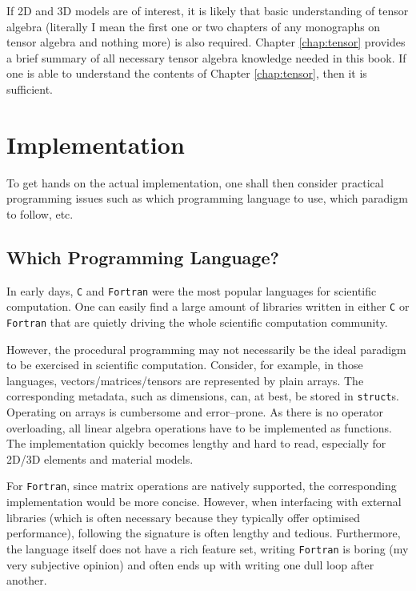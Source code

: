 If 2D and 3D models are of interest, it is likely that basic understanding of tensor algebra (literally I mean the first one or two chapters of any monographs on tensor algebra and nothing more) is also required.
Chapter \ref{chap:tensor} provides a brief summary of all necessary tensor algebra knowledge needed in this book.
If one is able to understand the contents of Chapter \ref{chap:tensor}, then it is sufficient.
\section{Implementation}
To get hands on the actual implementation, one shall then consider practical programming issues such as which programming language to use, which paradigm to follow, etc.
\subsection{Which Programming Language?}
In early days, \texttt{C} and \texttt{Fortran} were the most popular languages for scientific computation.
One can easily find a large amount of libraries written in either \texttt{C} or \texttt{Fortran} that are quietly driving the whole scientific computation community.

However, the procedural programming may not necessarily be the ideal paradigm to be exercised in scientific computation.
Consider, for example, in those languages, vectors/matrices/tensors are represented by plain arrays.
The corresponding metadata, such as dimensions, can, at best, be stored in \texttt{struct}s.
Operating on arrays is cumbersome and error--prone.
As there is no operator overloading, all linear algebra operations have to be implemented as functions.
The implementation quickly becomes lengthy and hard to read, especially for 2D/3D elements and material models.

For \texttt{Fortran}, since matrix operations are natively supported, the corresponding implementation would be more concise.
However, when interfacing with external libraries (which is often necessary because they typically offer optimised performance), following the signature is often lengthy and tedious.
Furthermore, the language itself does not have a rich feature set, writing \texttt{Fortran} is boring (my very subjective opinion) and often ends up with writing one dull loop after another.

